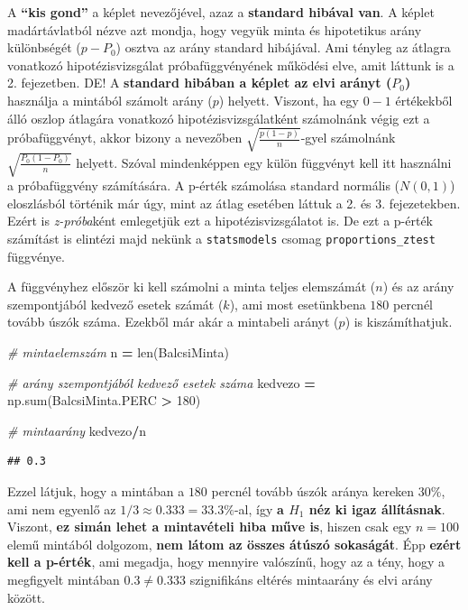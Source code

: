 \documentclass[
]{book}
\newenvironment{Shaded}{\begin{snugshade}}{\end{snugshade}}
\newcommand{\BuiltInTok}[1]{#1}
\newcommand{\CommentTok}[1]{\textcolor[rgb]{0.56,0.35,0.01}{\textit{#1}}}
\newcommand{\DecValTok}[1]{\textcolor[rgb]{0.00,0.00,0.81}{#1}}
\newcommand{\NormalTok}[1]{#1}
\newcommand{\OperatorTok}[1]{\textcolor[rgb]{0.81,0.36,0.00}{\textbf{#1}}}
\begin{document}
A \textbf{``kis gond''} a képlet nevezőjével, azaz a \textbf{standard hibával van}. A képlet madártávlatból nézve azt mondja, hogy vegyük minta és hipotetikus arány különbségét (\(p-P_0\)) osztva az arány standard hibájával. Ami tényleg az átlagra vonatkozó hipotézisvizsgálat próbafüggvényének működési elve, amit láttunk is a 2. fejezetben. DE! A \textbf{standard hibában a képlet az elvi arányt (\(P_0\))} használja a mintából számolt arány (\(p\)) helyett. Viszont, ha egy \(0-1\) értékekből álló oszlop átlagára vonatkozó hipotézisvizsgálatként számolnánk végig ezt a próbafüggvényt, akkor bizony a nevezőben \(\sqrt{\frac{p(1-p)}{n}}\)-gyel számolnánk \(\sqrt{\frac{P_0(1-P_0)}{n}}\) helyett. Szóval mindenképpen egy külön függvényt kell itt használni a próbafüggvény számítására. A p-érték számolása standard normális (\(N(0,1)\)) eloszlásból történik már úgy, mint az átlag esetében láttuk a 2. és 3. fejezetekben. Ezért is \emph{z-próba}ként emlegetjük ezt a hipotézisvizsgálatot is. De ezt a p-érték számítást is elintézi majd nekünk a \texttt{statsmodels} csomag \texttt{proportions\_ztest} függvénye.

A függvényhez először ki kell számolni a minta teljes elemszámát (\(n\)) és az arány szempontjából kedvező esetek számát (\(k\)), ami most esetünkbena \(180\) percnél tovább úszók száma. Ezekből már akár a mintabeli arányt (\(p\)) is kiszámíthatjuk.

\begin{Shaded}
\begin{Highlighting}[]
\CommentTok{\# mintaelemszám}
\NormalTok{n }\OperatorTok{=} \BuiltInTok{len}\NormalTok{(BalcsiMinta)}

\CommentTok{\# arány szempontjából kedvező esetek száma}
\NormalTok{kedvezo }\OperatorTok{=}\NormalTok{ np.}\BuiltInTok{sum}\NormalTok{(BalcsiMinta.PERC }\OperatorTok{\textgreater{}} \DecValTok{180}\NormalTok{)}

\CommentTok{\# mintaarány}
\NormalTok{kedvezo}\OperatorTok{/}\NormalTok{n}
\end{Highlighting}
\end{Shaded}

\begin{verbatim}
## 0.3
\end{verbatim}

Ezzel látjuk, hogy a mintában a \(180\) percnél tovább úszók aránya kereken \(30\%\), ami nem egyenlő az \(1/3 \approx 0.333 = 33.3\%\)-al, így \textbf{a \(H_1\) néz ki igaz állításnak}. Viszont, \textbf{ez simán lehet a mintavételi hiba műve is}, hiszen csak egy \(n=100\) elemű mintából dolgozom, \textbf{nem látom az összes átúszó sokaságát}. Épp \textbf{ezért kell a p-érték}, ami megadja, hogy mennyire valószínű, hogy az a tény, hogy a megfigyelt mintában \(0.3 \neq 0.333\) szignifikáns eltérés mintaarány és elvi arány között.
\end{document}
